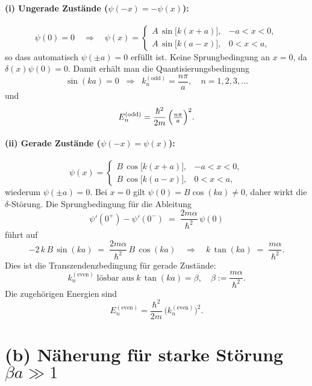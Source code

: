 \documentclass[a4paper,12pt]{article}
\begin{document}
\paragraph*{(i) Ungerade Zustände ($\psi(-x)=-\psi(x)$):}
\[
\psi(0)=0  \quad\Longrightarrow\quad 
\psi(x) = 
\begin{cases}
A\,\sin\bigl[k(x + a)\bigr], & -a<x<0,\\
A\,\sin\bigl[k(a - x)\bigr], & 0<x<a,
\end{cases}
\]
so dass automatisch $\psi(\pm a)=0$ erfüllt ist. Keine Sprungbedingung an $x=0$, da 
$\delta(x)\psi(0)=0$. Damit erhält man die Quantisierungsbedingung
\[
\sin(k a) = 0
\;\;\Longrightarrow\;\;
k_n^{(\text{odd})} = \frac{n\pi}{a},\quad n=1,2,3,\dots
\]
und
\[
E_n^{(\text{odd})} = \frac{\hbar^2}{2m}\,\Bigl(\tfrac{n\pi}{a}\Bigr)^2.
\]

\paragraph*{(ii) Gerade Zustände ($\psi(-x)=\psi(x)$):}
\[
\psi(x) = 
\begin{cases}
B\,\cos\bigl[k(x + a)\bigr], & -a<x<0,\\
B\,\cos\bigl[k(a - x)\bigr], & 0<x<a,
\end{cases}
\]
wiederum $\psi(\pm a)=0$. Bei $x=0$ gilt $\psi(0)=B\cos(ka)\neq0$, daher wirkt die
$\delta$-Störung. Die Sprungbedingung für die Ableitung
\[
\psi'(0^+) - \psi'(0^-) \;=\;\frac{2m\alpha}{\hbar^2}\,\psi(0)
\]
führt auf
\[
-2\,k\,B\,\sin(k a)
\;=\;\frac{2m\alpha}{\hbar^2}\,B\,\cos(k a)
\quad\Longrightarrow\quad
k\,\tan(k a) \;=\;\frac{m\alpha}{\hbar^2}.
\]
Dies ist die Transzendenzbedingung für gerade Zustände:
\[
k_n^{(\text{even})}\;\text{lösbar aus}\;k\,\tan(k a)=\beta,
\quad\beta:=\frac{m\alpha}{\hbar^2}.
\]
Die zugehörigen Energien sind
\[
E_n^{(\text{even})} = \frac{\hbar^2}{2m}\,\bigl(k_n^{(\text{even})}\bigr)^2.
\]

\medskip
\noindent
{}

\section{(b) Näherung für starke Störung $\beta a\gg1$}
\end{document}
